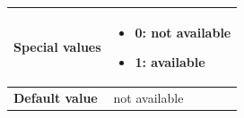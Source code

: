 \begin{itemize}
\begin{longtable}{|l|l|}
				\hline

					\begin{minipage}[t]{0.22\linewidth} \textbf{Special values}	\end{minipage}
				&	\begin{minipage}[t]{0.78\linewidth} \begin{itemize} \item 0: not available \item 1: available \end{itemize} \end{minipage} \\

				\hline

					\begin{minipage}[t]{0.22\linewidth} \textbf{Default value}	\end{minipage}
				&	\begin{minipage}[t]{0.78\linewidth} not available \end{minipage} \\

				\hline

			\end{longtable}

	\end{itemize}

